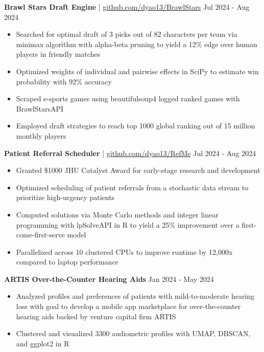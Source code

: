 \documentclass[11pt]{article}       %
\begin{document}
\textbf{Brawl Stars Draft Engine} | \href{https://github.com/dyao13/BrawlStars}{github.com/dyao13/BrawlStars} \hfill Jul 2024 - Aug 2024 \vspace{-9pt} \\
\begin{itemize}
  \item Searched for optimal draft of 3 picks out of 82 characters per team via minimax algorithm with alpha-beta pruning to yield a 12\% edge over human players in friendly matches
  \item Optimized weights of individual and pairwise effects in SciPy to estimate win probability with 92\% accuracy
  \item Scraped e-sports games using beautifulsoup4 logged ranked games with BrawlStarsAPI
  \item Employed draft strategies to reach top 1000 global ranking out of 15 million monthly players
\end{itemize}

\textbf{Patient Referral Scheduler} | \href{https://github.com/dyao13/RefMe}{github.com/dyao13/RefMe} \hfill Jul 2024 - Aug 2024 \vspace{-9pt} \\
\begin{itemize}
  \item Granted \$1000 JHU Catalyst Award for early-stage research and development
  \item Optimized scheduling of patient referrals from a stochastic data stream to prioritize high-urgency patients 
  \item Computed solutions via Monte Carlo methods and integer linear programming with lpSolveAPI in R to yield a 25\% improvement over a first-come-first-serve model
  \item Parallelized across 10 clustered CPUs to improve runtime by 12,000x compared to laptop performance
\end{itemize}

\textbf{ARTIS Over-the-Counter Hearing Aids} \hfill Jan 2024 - May 2024 \vspace{-9pt} \\
\begin{itemize}
  \item Analyzed profiles and preferences of patients with mild-to-moderate hearing loss with goal to develop a mobile app marketplace for over-the-counter hearing aids backed by venture capital firm ARTIS
  \item Clustered and visualized 3300 audiometric profiles with UMAP, DBSCAN, and ggplot2 in R
\end{itemize}
\end{document}
